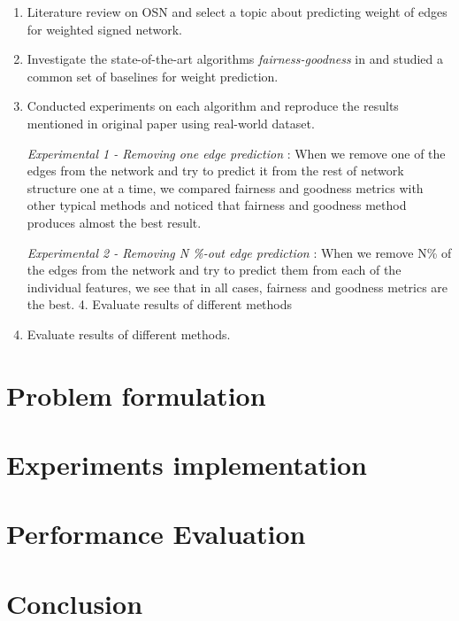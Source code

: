 \documentclass{article}
\begin{document}
\begin{enumerate}
	\item Literature review on OSN and select a topic about predicting weight of edges for weighted signed network.
	
	\item Investigate the state-of-the-art algorithms \emph{fairness-goodness} in\cite{kumar2016edge} and  studied a common set of baselines for weight prediction.
	
	\item Conducted experiments on each algorithm and reproduce the results mentioned in original paper using real-world dataset.
	
	\emph{Experimental 1 -   Removing one edge prediction} : When we remove one of the edges from the network and try to predict it from the rest of network structure one at a time, we compared fairness and goodness metrics with other typical methods and noticed that fairness and goodness method produces almost the best result. 
	
	\emph{Experimental 2 -  Removing N \%-out edge prediction} : When we remove N\% of the edges from the network and try to predict them from each of the individual features, we see that in all cases, fairness and goodness metrics are the best.
	4. Evaluate results of different methods
	
	
	\item Evaluate results of different methods.
\end{enumerate}

\section{Problem formulation}

\section{Experiments implementation}




















\section{Performance Evaluation}




\section{Conclusion}




\end{document}
